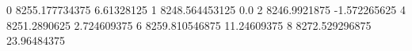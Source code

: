 0 8255.177734375 6.61328125
1 8248.564453125 0.0
2 8246.9921875 -1.572265625
4 8251.2890625 2.724609375
6 8259.810546875 11.24609375
8 8272.529296875 23.96484375
